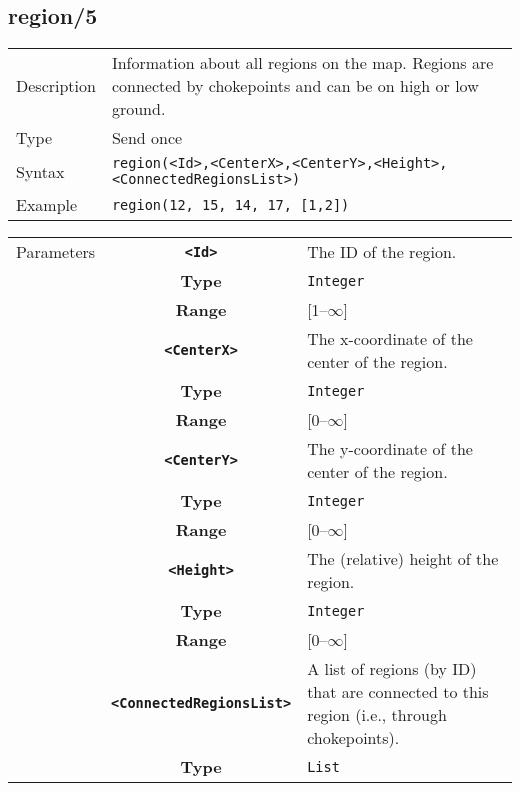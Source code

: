 \subsection{region/5}
\begin{tabularx}{\textwidth}{lX}
 Description & Information about all regions on the map. Regions are connected by chokepoints and can be on high or low ground. \\
 Type & Send once \\
 Syntax & \verb|region(<Id>,<CenterX>,<CenterY>,<Height>,<ConnectedRegionsList>)| \\
 Example & \verb|region(12, 15, 14, 17, [1,2])| \\
 \end{tabularx}
 \begin{tabularx}{\textwidth}{l | c | p{8cm}|}
 \cline{2-3}
 Parameters & \textbf{\verb|<Id>|} & The ID of the region.\\
            & \textbf{Type} & \verb|Integer| \\
            & \textbf{Range} & [1--$\infty$] \\
            \cline{2-3}
            & \textbf{\verb|<CenterX>|} & The x-coordinate of the center of the region.\\
            & \textbf{Type} & \verb|Integer| \\
            & \textbf{Range} & [0--$\infty$] \\
            \cline{2-3}
            & \textbf{\verb|<CenterY>|} & The y-coordinate of the center of the region.\\
            & \textbf{Type} & \verb|Integer| \\
            & \textbf{Range} & [0--$\infty$] \\
            \cline{2-3}
            & \textbf{\verb|<Height>|} & The (relative) height of the region.\\
            & \textbf{Type} & \verb|Integer| \\
            & \textbf{Range} & [0--$\infty$] \\
            \cline{2-3}
            & \textbf{\verb|<ConnectedRegionsList>|} & A list of regions (by ID) that are connected to this region (i.e., through chokepoints).\\
            & \textbf{Type} & \verb|List| \\
            \cline{2-3}
\end{tabularx}

\newpage

